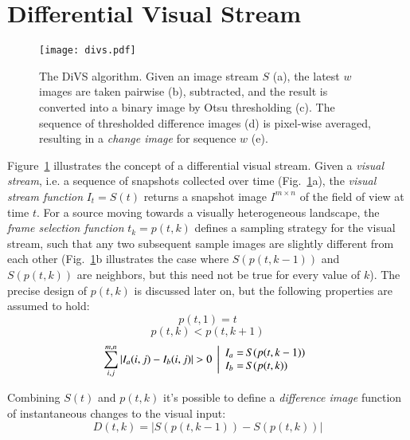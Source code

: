 \documentclass[twocolumn, 9pt,fleqn]{jsproceedings}
\begin{document}
\section{Differential Visual Stream}

\begin{figure}[h!]
\texttt{[image: divs.pdf]}
\caption{The DiVS algorithm. Given an image stream $S$ (a), the latest $w$ images are taken pairwise (b), subtracted, and the result is converted into a binary image by Otsu thresholding (c). The sequence of thresholded difference images (d) is pixel-wise averaged, resulting in a \textit{change image} for sequence $w$ (e).}
\label{fig:divs}
\end{figure}

Figure~\ref{fig:divs} illustrates the concept of a differential visual stream. Given a \textit{visual stream}, i.e. a sequence of snapshots collected over time (Fig.~\ref{fig:divs}a), the \textit{visual stream function} $I_t = S(t)$ returns a snapshot image $I^{m \times n}$ of the field of view at time $t$. For a source moving towards a visually heterogeneous landscape, the \textit{frame selection function} $t_k = p(t, k)$ defines a sampling strategy for the visual stream, such that any two subsequent sample images are slightly different from each other (Fig.~\ref{fig:divs}b illustrates the case where $S(p(t, k-1))$ and $S(p(t, k))$ are neighbors, but this need not be true for every value of $k$). The precise design of $p(t, k)$ is discussed later on, but the following properties are assumed to hold:
\begin{equation}
p(t, 1) = t
\end{equation}
\begin{equation}
p(t, k) < p(t, k+1)
\end{equation}
\begin{equation}
\sum_{i, j}^{m, n}{|I_a(i, j) - I_b(i, j)|} > 0 \; \left|
\begin{array}{r@{\hspace{2bp}} l}
I_a = & S(p(t, k-1)) \\
I_b = & S(p(t, k))
\end{array}
\right.
\end{equation}

Combining $S(t)$ and $p(t, k)$ it's possible to define a \textit{difference image} function of instantaneous changes to the visual input:
\begin{equation}
D(t, k) = | S(p(t, k-1)) - S(p(t, k)) |
\end{equation}
\end{document}
